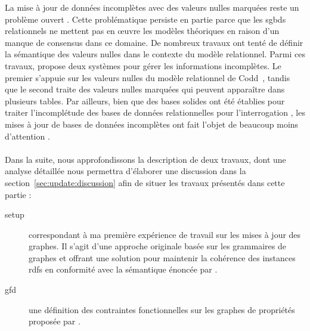 La mise à jour de données incomplètes avec des valeurs nulles marquées reste un problème ouvert \cite{libkinIncompleteDataWhat2014,consoleCopingIncompleteData2020}.
Cette problématique persiste en partie parce que les \glspl{sgbd} relationnels ne mettent pas en œuvre les modèles théoriques en raison d'un manque de consensus dans ce domaine.
De nombreux travaux ont tenté de définir la sémantique des valeurs nulles dans le contexte du modèle relationnel.
Parmi ces travaux, \cite{imielinskiIncompleteInformationRelational1984} propose deux systèmes pour gérer les informations incomplètes.
Le premier s'appuie sur les valeurs nulles du modèle relationnel de Codd~\cite{coddRelationalModelData1970}, tandis que le second traite des valeurs nulles marquées qui peuvent apparaître dans plusieurs tables.
Par ailleurs, bien que des bases solides ont été établies pour traiter l'incomplétude des bases de données relationnelles pour l'interrogation \cite{zanioloDatabaseRelationsNull1984,imielinskiIncompleteInformationRelational1984,faginUpdatingLogicalDatabases1986,reiterSoundSometimesComplete1986,grahneProblemIncompleteInformation1991,bravoSemanticallyCorrectQuery2006,libkinSQLThreevaluedLogic2016,nikolaouQueryingIncompleteInformation2016,guagliardoCorrectnessSQLQueries2017}, les mises à jour de bases de données incomplètes ont fait l'objet de beaucoup moins d'attention \cite{abiteboulUpdateSemanticsIncomplete1985,faginSemanticsUpdatesDatabases1983,winslettModelbasedApproachUpdating1988,winslettUpdatingLogicalDatabases1990,degiacomoDealingInconsistenciesIncompleteness2009,degiacomoPracticalUpdateManagement2017,chabinConsistentUpdatingDatabases2020}.

\paragraph{}
Dans la suite, nous approfondissons la description de deux travaux, dont une analyse détaillée nous permettra d'élaborer une discussion dans la section~\ref{sec:update:discussion} afin de situer les travaux présentés dans cette partie :

\begin{description}    
    \item[\gls{setup}] correspondant à ma première expérience de travail sur les mises à jour des graphes.
    Il s'agit d'une approche originale basée sur les grammaires de graphes et offrant une solution pour maintenir la cohérence des instances \glspl{rdf} en conformité avec la sémantique énoncée par \cite{flourisFormalFoundationsRDF2013}.
    
    \item[\gls{gfd}] une définition des contraintes fonctionnelles sur les graphes de propriétés proposée par \cite{fanDependenciesGraphs2019}.
\end{description}
